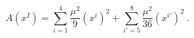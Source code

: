 \begin{equation}
A(x^I) = \sum^4_{i=1} \frac{\mu^2}{9} (x^i)^2
            +\sum^8_{i'=5} \frac{\mu^2}{36} (x^{i'})^2~.
\end{equation}

